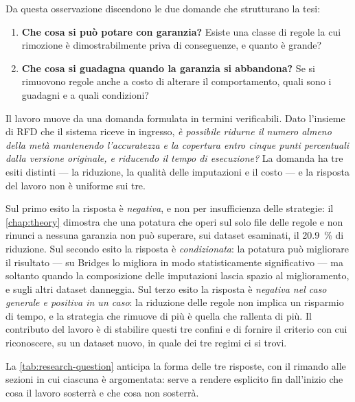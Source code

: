 Da questa osservazione discendono le due domande che strutturano la tesi:

\begin{enumerate}[label=\textbf{D\arabic*.},leftmargin=2.2em]
    \item \textbf{Che cosa si può potare con garanzia?} Esiste una classe di regole la cui
    rimozione è dimostrabilmente priva di conseguenze, e quanto è grande?
    \item \textbf{Che cosa si guadagna quando la garanzia si abbandona?} Se si rimuovono regole
    anche a costo di alterare il comportamento, quali sono i guadagni e a quali condizioni?
\end{enumerate}

\label{sec:research-question}

Il lavoro muove da una domanda formulata in termini verificabili. Dato l'insieme di RFD che il
sistema riceve in ingresso, \emph{è possibile ridurne il numero almeno della metà mantenendo
l'accuratezza e la copertura entro cinque punti percentuali dalla versione originale, e riducendo
il tempo di esecuzione?} La domanda ha tre esiti distinti --- la riduzione, la qualità delle
imputazioni e il costo --- e la risposta del lavoro non è uniforme sui tre.

Sul primo esito la risposta è \emph{negativa}, e non per insufficienza delle strategie: il
\autoref{chap:theory} dimostra che una potatura che operi sul solo file delle regole e non rinunci
a nessuna garanzia non può superare, sui dataset esaminati, il \SI{20.9}{\percent} di riduzione.
Sul secondo esito la risposta è \emph{condizionata}: la potatura può migliorare il risultato --- su
Bridges lo migliora in modo statisticamente significativo --- ma soltanto quando la composizione
delle imputazioni lascia spazio al miglioramento, e sugli altri dataset danneggia. Sul terzo esito
la risposta è \emph{negativa nel caso generale e positiva in un caso}: la riduzione delle regole
non implica un risparmio di tempo, e la strategia che rimuove di più è quella che rallenta di più.
Il contributo del lavoro è di stabilire questi tre confini e di fornire il criterio con cui
riconoscere, su un dataset nuovo, in quale dei tre regimi ci si trovi.

La \autoref{tab:research-question} anticipa la forma delle tre risposte, con il rimando alle
sezioni in cui ciascuna è argomentata: serve a rendere esplicito fin dall'inizio che cosa il
lavoro sosterrà e che cosa non sosterrà.


